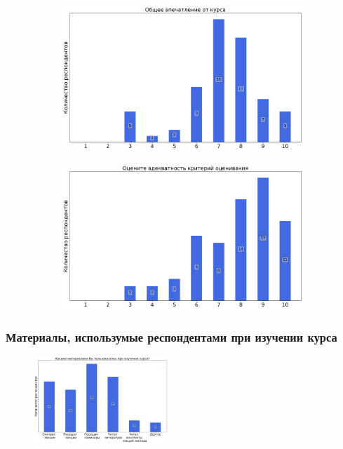 		\begin{figure}[H]
			\centering
			\begin{subfigure}[b]{0.45\textwidth}
				\centering
				\includegraphics[width=\textwidth]{images/1 course/Общая физика - механика/general-0.png}
			\end{subfigure}
			\begin{subfigure}[b]{0.45\textwidth}
				\centering
				\includegraphics[width=\textwidth]{images/1 course/Общая физика - механика/general-1.png}
			\end{subfigure}	
		\end{figure}

	\subsubsection{Материалы, использумые респондентами при изучении курса}

		\begin{figure}[H]
			\centering
			\includegraphics[width = 0.45\textwidth]{images/1 course/Общая физика - механика/materials.png}
		\end{figure}

